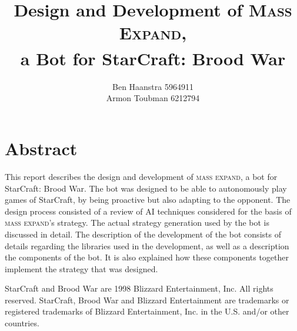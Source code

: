 \documentclass[11pt,a4paper,oneside]{book} %
\title{\huge Design and Development of \textsc{Mass Expand},\\ a Bot for StarCraft\textsuperscript{\small \textregistered}: Brood War\textsuperscript{\small \textregistered}}
\author{Ben Haanstra 5964911\\
Armon Toubman 6212794}
\newcommand{\massexpand}{\textsc{mass expand}\xspace} %
\begin{document}
\maketitle






\chapter*{\centering Abstract}
This report describes the design and development of \massexpand{}, a bot for StarCraft: Brood War. The bot was designed to be able to autonomously play games of StarCraft, by being proactive but also adapting to the opponent. The design process consisted of a review of AI techniques considered for the basis of \massexpand{}'s strategy. The actual strategy generation used by the bot is discussed in detail. The description of the development of the bot consists of details regarding the libraries used in the development, as well as a description the components of the bot. It is also explained how these components together implement the strategy that was designed.


\vfill{}

\noindent{}StarCraft and Brood War are \textcopyright{}1998 Blizzard Entertainment, Inc. All rights reserved. StarCraft, Brood War and Blizzard Entertainment are trademarks or registered trademarks of Blizzard Entertainment, Inc. in the U.S. and/or other countries.
\pagestyle{empty}
\clearpage

\frontmatter

\tableofcontents



\mainmatter

\pagestyle{fancy}
















\backmatter


\end{document}
